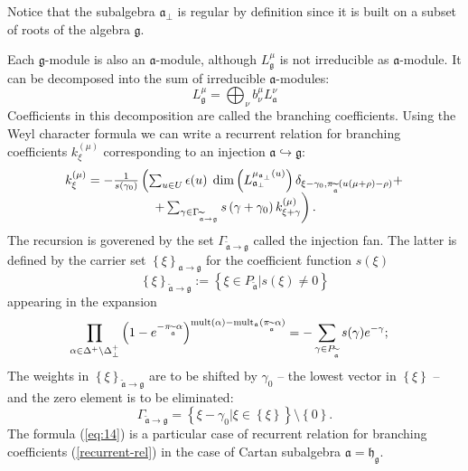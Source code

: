 \documentclass[preprint,12pt]{elsarticle}
\newcommand{\gf}{\mathfrak{g}}
\newcommand{\af}{\mathfrak{a}}
\newcommand{\afb}{\mathfrak{a}_{\bot}}
\newcommand{\hf}{\mathfrak{h}}
\newcommand{\hfg}{\hf_{\gf}}
\begin{document}
Notice that the subalgebra $\mathfrak{a}_{\bot}$ is regular by definition
since it is built on a subset of roots of the algebra $\mathfrak{g}$.

Each $\gf$-module is also an $\af$-module, although
$L^{\mu}_{\gf}$ is not irreducible as $\af$-module. It can be
decomposed into the sum of irreducible $\af$-modules:
\begin{equation}
  \label{eq:16}
  L^{\mu}_{\gf}=\bigoplus_{\nu}b^{\mu}_{\nu}L^{\nu}_{\af}
\end{equation}
Coefficients in this decomposition are called the branching
coefficients. Using the Weyl character formula we can write a
recurrent relation \cite{2010arXiv1007.0318L} for branching
coefficients $k_{\xi }^{\left( \mu \right) }$ corresponding to an
injection $\af\hookrightarrow \gf$:
\begin{equation}
\begin{array}{c}
k_{\xi }^{\left( \mu \right) }=-\frac{1}{s\left( \gamma _{0}\right) }\left(
\sum_{u\in U}\epsilon (u)\;\dim \left( L_{\afb}^{\mu _{\af%
_{\perp }}\left( u\right) }\right) \delta _{\xi -\gamma _{0},\pi _{%
\widetilde{\af}}(u(\mu +\rho )-\rho )}+\right.  \\
\left. +\sum_{\gamma \in \Gamma _{\widetilde{\af}\rightarrow \gf%
}}s\left( \gamma +\gamma _{0}\right) k_{\xi +\gamma }^{\left( \mu \right)
}\right) .
\end{array}
\label{recurrent-rel}
\end{equation}
The recursion is goverened by the set $\Gamma _{\widetilde{\af}\rightarrow \gf}$ called the injection fan. The latter is defined by the
carrier set $\left\{ \xi \right\} _{\af\rightarrow \gf}$ for the
coefficient function $s(\xi )$
\begin{equation*}
\left\{ \xi \right\} _{\widetilde{\af}\rightarrow \gf}:=\left\{
\xi \in P_{\widetilde{\af}}|s(\xi )\neq 0\right\}
\end{equation*}
appearing in the expansion
\begin{equation}
\prod_{\alpha \in \Delta ^{+}\setminus \Delta _{\bot }^{+}}\left( 1-e^{-\pi
_{\widetilde{\af}}\alpha }\right) ^{\mathrm{mult}(\alpha )-\mathrm{mult}%
_{\af}(\pi _{\widetilde{\af}}\alpha )}=-\sum_{\gamma \in P_{%
\widetilde{\af}}}s(\gamma )e^{-\gamma };\quad
\end{equation}
The weights in $\left\{ \xi \right\} _{\widetilde{\af}\rightarrow \gf}$ are to be shifted by $\gamma _{0}$ -- the lowest vector in $\left\{ \xi
\right\} $ -- and the zero element is to be eliminated:
\begin{equation}
\Gamma _{\widetilde{\af}\rightarrow \gf}=\left\{ \xi -\gamma
_{0}|\xi \in \left\{ \xi \right\} \right\} \setminus \left\{ 0\right\} .
\end{equation}
The formula (\ref{eq:14}) is a particular case of recurrent relation for branching coefficients (\ref{recurrent-rel}) in the case of Cartan subalgebra $\af=\hfg$.
\end{document}
